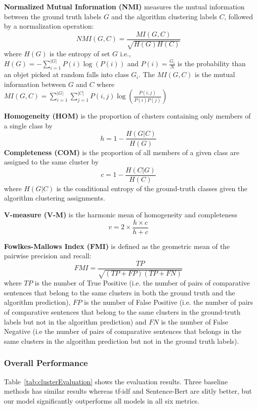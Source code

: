 \textbf{Normalized Mutual Information (NMI)} measures the mutual information between the ground truth labels $G$ and the algorithm clustering labels $C$, followed by a normalization operation:
$$ NMI(G, C) = \frac{MI(G, C)}{\sqrt{H(G) H(C)}} $$
where $H(G)$ is the entropy of set $G$ i.e., $H(G) = - \sum^{|G|}_{i=1}P(i) \log (P(i)) $ and $P(i) = \frac{G_i}{N}$ is the probability than an objet picked at random falls into class $G_i$.
The $MI(G, C)$ is the mutual information between $G$ and $C$ where $MI(G, C) = \sum^{|G|}_{i=1} \sum^{|C|}_{j=1} P(i, j) \log ( \frac{P(i, j)}{P(i)P(j)} )$


\textbf{Homogeneity (HOM)} is the proportion of clusters containing only members of a single class by
$$ h = 1 - \frac{H(G|C)}{H(G)} $$
\textbf{Completeness (COM)} is the proportion of all members of a given class are assigned to the same cluster by
$$ c = 1 - \frac{H(C|G)}{H(C)} $$
where $H(G|C)$ is the conditional entropy of the ground-truth classes given the algorithm clustering assignments.

\textbf{V-measure (V-M)} is the harmonic mean of homogeneity and completeness
$$ v = 2 \times \frac{h\times c}{h+c} $$

\textbf{Fowlkes-Mallows Index (FMI)} is defined as the geometric mean of the pairwise precision and recall:
$$ FMI = \frac{TP}{\sqrt{(TP+FP)(TP+FN)}} $$
where $TP$ is the number of True Positive (i.e. the number of pairs of comparative sentences that belong to the same clusters in both the ground truth and the algorithm prediction), $FP$ is the number of False Positive (i.e. the number of pairs of comparative sentences that belong to the same clusters in the ground-truth labels but not in the algorithm prediction) and $FN$ is the number of False Negative (i.e the number of pairs of comparative sentences that belongs in the same clusters in the algorithm prediction but not in the ground truth labels).

\subsubsection{Overall Performance}
Table~\ref{tab:clusterEvaluation} shows the evaluation results.
Three baseline methods has similar results whereas tf-idf and Sentence-Bert are slitly better, but our model significantly outperforms all models in all six metrics.

